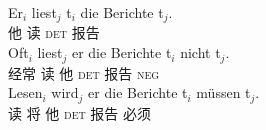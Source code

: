 \eal
\ex 
\gll Er$_i$ liest$_j$ t$_i$ die Berichte t$_j$.\\
	 他 读 {}    \textsc{det} 报告\\
\ex 
\gll Oft$_i$ liest$_j$ er die Berichte t$_i$ nicht t$_j$.\\
	经常 读 他 \textsc{det} 报告 {} \textsc{neg}\\
\ex 
\gll Lesen$_i$ wird$_j$ er die Berichte t$_i$ müssen t$_j$.\\
	 读 将 他 \textsc{det} 报告 {} 必须\\
\zl

